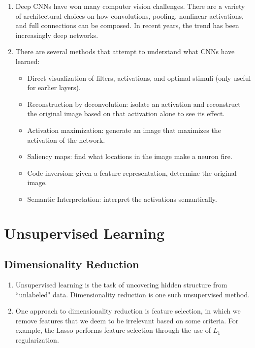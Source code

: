 \documentclass[10pt]{article}
\begin{document}
\begin{multicols}{2}
\begin{addmargin}[0.8em]{0.5em}
\begin{enumerate}[label=(\alph*)]
        \item Deep CNNs have won many computer vision challenges. There are a variety of architectural choices on how convolutions, pooling, nonlinear activations, and full connections can be composed. In recent years, the trend has been increasingly deep networks.
        
        \item There are several methods that attempt to understand what CNNs have learned:
        \begin{itemize}
            \item Direct visualization of filters, activations, and optimal stimuli (only useful for earlier layers).
            \item Reconstruction by deconvolution: isolate an activation and reconstruct the original image based on that activation alone to see its effect.
            \item Activation maximization: generate an image that maximizes the activation of the network.
            \item Saliency maps: find what locations in the image make a neuron fire.
            \item Code inversion: given a feature representation, determine the original image.
            \item Semantic Interpretation: interpret the activations semantically.
        \end{itemize}
    \end{enumerate}
\end{addmargin}

\section{Unsupervised Learning}
\begin{addmargin}[0.8em]{0.5em}
    \subsection{Dimensionality Reduction}
    \begin{enumerate}[label=(\alph*)]
        \item Unsupervised learning is the task of uncovering hidden structure from ``unlabeled" data. Dimensionality reduction is one such unsupervised method.
        
        \item One approach to dimensionality reduction is feature selection, in which we remove features that we deem to be irrelevant based on some criteria. For example, the Lasso performs feature selection through the use of $L_1$ regularization.
        

\end{enumerate}
\end{addmargin}
\end{multicols}
\end{document}
